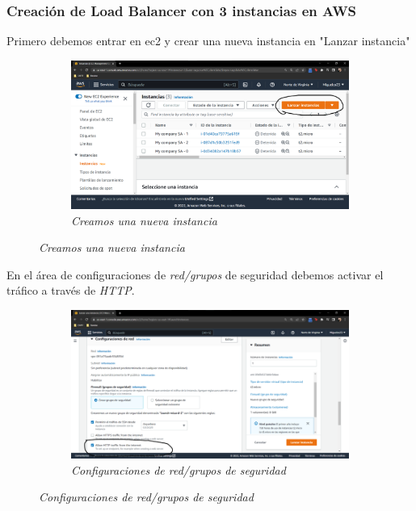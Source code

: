 \subsubsection{Creación de Load Balancer con 3 instancias en AWS}
Primero debemos entrar en ec2 y crear una nueva instancia en "Lanzar instancia"

\begin{figure}[H]
    \centering
    \begin{subfigure}[b]{0.8\textwidth}
        \centering
        \includegraphics[width=\textwidth]{Figures/0. General/load_balancer_0.png}
        \caption{\textit{Creamos una nueva instancia}}
        \label{fig: load balancer 0}
    \end{subfigure}
\end{figure}

En el área de configuraciones de \textit{red/grupos} de seguridad debemos
activar el tráfico a través de \textit{HTTP}.

\begin{figure}[H]
    \centering
    \begin{subfigure}[b]{0.8\textwidth}
        \centering
        \includegraphics[width=\textwidth]{Figures/0. General/load_balancer_1.png}
        \caption{\textit{Configuraciones de \textit{red/grupos} de seguridad}}
        \label{fig: load balancer 1}
    \end{subfigure}
\end{figure}


